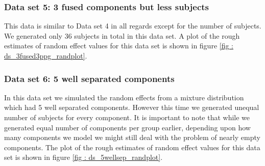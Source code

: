 \subsubsection{Data set 5: 3 fused components but less subjects}
\label{subsubsec : ds_3fused_3ppg}
This data is similar to Data set 4 in all regards except for the number of subjects. We generated only 36 subjects in total in this data set. A plot of the rough estimates of random effect values for this data set is shown in figure \ref{fig : ds_3fused3ppg_randplot}.

\subsubsection{Data set 6: 5 well separated components}
\label{subsubsec : ds_5wellsep}
In this data set we simulated the random effects from a mixture distribution which had 5 well separated components. However this time we generated unequal number of subjects for every component. It is important to note that while we generated equal number of components per group earlier, depending upon how many components we model we might still deal with the problem of nearly empty components. The plot of the rough estimates of random effect values for this data set is shown in figure \ref{fig : ds_5wellsep_randplot}.


